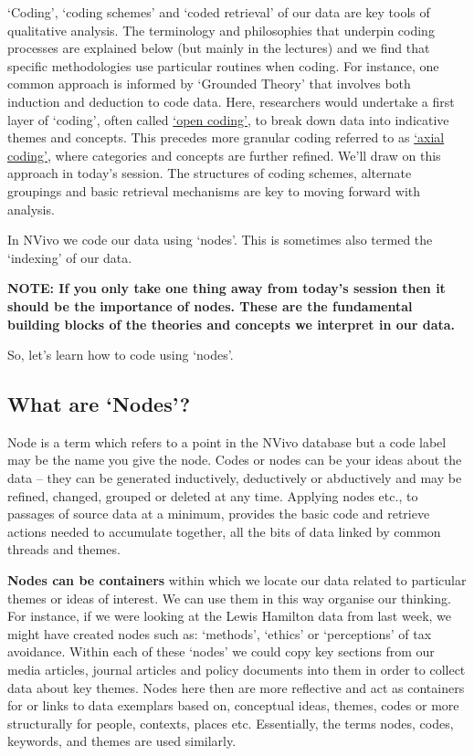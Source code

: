 \documentclass[]{book}
\theoremstyle{definition}
\theoremstyle{definition}
\theoremstyle{definition}
\theoremstyle{remark}
\begin{document}
`Coding', `coding schemes' and `coded retrieval' of our data are key
tools of qualitative analysis. The terminology and philosophies that
underpin coding processes are explained below (but mainly in the
lectures) and we find that specific methodologies use particular
routines when coding. For instance, one common approach is informed by
`Grounded Theory' that involves both induction and deduction to code
data. Here, researchers would undertake a first layer of `coding', often
called
\href{http://methods.sagepub.com/reference/sage-encyc-qualitative-research-methods/n299.xml}{`open
coding'}, to break down data into indicative themes and concepts. This
precedes more granular coding referred to as
\href{http://methods.sagepub.com/reference/encyc-of-case-study-research/n54.xml}{`axial
coding'}, where categories and concepts are further refined. We'll draw
on this approach in today's session. The structures of coding schemes,
alternate groupings and basic retrieval mechanisms are key to moving
forward with analysis.

In NVivo we code our data using `nodes'. This is sometimes also termed
the `indexing' of our data.

\textbf{NOTE: If you only take one thing away from today's session then
it should be the importance of nodes. These are the fundamental building
blocks of the theories and concepts we interpret in our data.}

So, let's learn how to code using `nodes'.

\hypertarget{what-are-nodes}{%
\subsection{What are `Nodes'?}\label{what-are-nodes}}

Node is a term which refers to a point in the NVivo database but a code
label may be the name you give the node. Codes or nodes can be your
ideas about the data -- they can be generated inductively, deductively
or abductively and may be refined, changed, grouped or deleted at any
time. Applying nodes etc., to passages of source data at a minimum,
provides the basic code and retrieve actions needed to accumulate
together, all the bits of data linked by common threads and themes.

\textbf{Nodes can be containers} within which we locate our data related
to particular themes or ideas of interest. We can use them in this way
organise our thinking. For instance, if we were looking at the Lewis
Hamilton data from last week, we might have created nodes such as:
`methods', `ethics' or `perceptions' of tax avoidance. Within each of
these `nodes' we could copy key sections from our media articles,
journal articles and policy documents into them in order to collect data
about key themes. Nodes here then are more reflective and act as
containers for or links to data exemplars based on, conceptual ideas,
themes, codes or more structurally for people, contexts, places etc.
Essentially, the terms nodes, codes, keywords, and themes are used
similarly.
\end{document}
